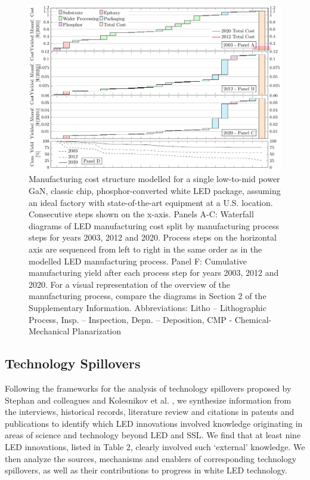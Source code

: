\documentclass[parskip=full]{article}
\begin{document}
\begin{figure}[h!]
 \centering
 \includegraphics[width=17.5cm]{figures/costmodel_results_years.pdf}
 \caption{Manufacturing cost structure modelled for a single low-to-mid power GaN, classic chip, phosphor-converted white LED package, assuming an ideal factory with state-of-the-art equipment at a U.S. location. Consecutive steps shown on the x-axis. Panels A-C: Waterfall diagrams of LED manufacturing cost split by manufacturing process steps for years 2003, 2012 and 2020. Process steps on the horizontal axis are sequenced from left to right in the same order as in the modelled LED manufacturing process. Panel F: Cumulative manufacturing yield after each process step for years 2003, 2012 and 2020. For a visual representation of the overview of the manufacturing process, compare the diagrams in Section 2 of the Supplementary Information. Abbreviations: Litho – Lithographic Process, Insp. – Inspection, Depn. – Deposition, CMP - Chemical-Mechanical Planarization}
 \label{fgr:costmodel}
\end{figure}

\subsection{Technology Spillovers}

Following the frameworks for the analysis of technology spillovers proposed by Stephan and colleagues \cite{Stephan2021} and Kolesnikov et al. \cite{kolesnikov2022technology}, we synthesize information from the interviews, historical records, literature review and citations in patents and publications to identify which LED innovations involved knowledge originating in areas of science and technology beyond LED and SSL. We find that at least nine LED innovations, listed in Table 2, clearly involved such ‘external’ knowledge. We then analyze the sources, mechanisms and enablers of corresponding technology spillovers, as well as their contributions to progress in white LED technology. 
\end{document}
